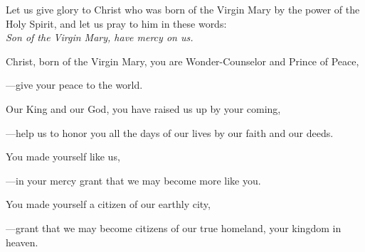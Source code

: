 \intercessions\indent

\begin{hangpar}

Let us give glory to Christ who was born of the Virgin Mary by the power of the Holy Spirit, and let us pray to him in these words:\\
\emph{Son of the Virgin Mary, have mercy on us.}

\medskip Christ, born of the Virgin Mary, you are Wonder-Counselor and Prince of Peace,

{\color{red}---\thinspace}give your peace to the world.

\medskip Our King and our God, you have raised us up by your coming,

{\color{red}---\thinspace}help us to honor you all the days of our lives by our faith and our deeds.

\medskip You made yourself like us,

{\color{red}---\thinspace}in your mercy grant that we may become more like you.

\medskip You made yourself a citizen of our earthly city,

{\color{red}---\thinspace}grant that we may become citizens of our true homeland, your kingdom in heaven.

\medskip

\end{hangpar}